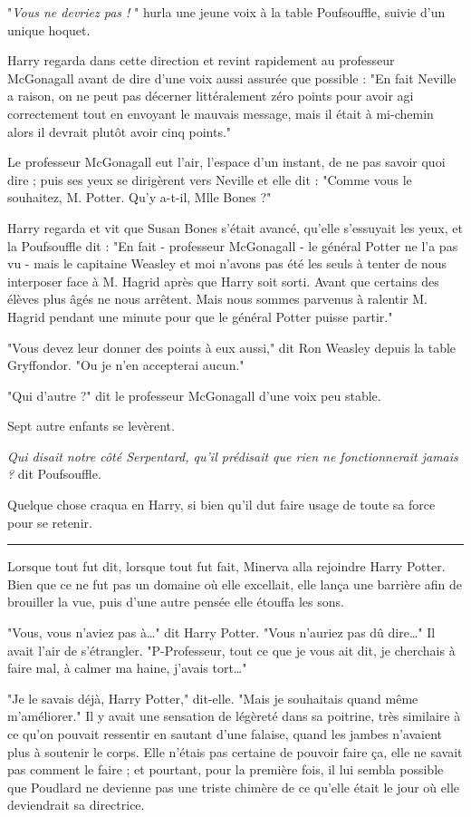 "\emph{Vous ne devriez pas !} " hurla une jeune voix à la table Poufsouffle, suivie d'un unique hoquet.

Harry regarda dans cette direction et revint rapidement au professeur McGonagall avant de dire d'une voix aussi assurée que possible : "En fait Neville a raison, on ne peut pas décerner littéralement zéro points pour avoir agi correctement tout en envoyant le mauvais message, mais il était à mi-chemin alors il devrait plutôt avoir cinq points."

Le professeur McGonagall eut l'air, l'espace d'un instant, de ne pas savoir quoi dire ; puis ses yeux se dirigèrent vers Neville et elle dit : "Comme vous le souhaitez, M. Potter. Qu'y a-t-il, Mlle Bones ?"

Harry regarda et vit que Susan Bones s'était avancé, qu'elle s'essuyait les yeux, et la Poufsouffle dit : "En fait - professeur McGonagall - le général Potter ne l'a pas vu - mais le capitaine Weasley et moi n'avons pas été les seuls à tenter de nous interposer face à M. Hagrid après que Harry soit sorti. Avant que certains des élèves plus âgés ne nous arrêtent. Mais nous sommes parvenus à ralentir M. Hagrid pendant une minute pour que le général Potter puisse partir."

"Vous devez leur donner des points à eux aussi," dit Ron Weasley depuis la table Gryffondor. "Ou je n'en accepterai aucun."

"Qui d'autre ?" dit le professeur McGonagall d'une voix peu stable.

Sept autre enfants se levèrent.

\emph{Qui disait notre côté Serpentard, qu'il prédisait que rien ne fonctionnerait jamais ?}  dit Poufsouffle.

Quelque chose craqua en Harry, si bien qu'il dut faire usage de toute sa force pour se retenir.
\par\noindent\rule{\textwidth}{0.4pt}
Lorsque tout fut dit, lorsque tout fut fait, Minerva alla rejoindre Harry Potter. Bien que ce ne fut pas un domaine où elle excellait, elle lança une barrière afin de brouiller la vue, puis d'une autre pensée elle étouffa les sons.

"Vous, vous n'aviez pas à…" dit Harry Potter. "Vous n'auriez pas dû dire…" Il avait l'air de s'étrangler. "P-Professeur, tout ce que je vous ait dit, je cherchais à faire mal, à calmer ma haine, j'avais tort…"

"Je le savais déjà, Harry Potter," dit-elle. "Mais je souhaitais quand même m'améliorer." Il y avait une sensation de légèreté dans sa poitrine, très similaire à ce qu'on pouvait ressentir en sautant d'une falaise, quand les jambes n'avaient plus à soutenir le corps. Elle n'étais pas certaine de pouvoir faire ça, elle ne savait pas comment le faire ; et pourtant, pour la première fois, il lui sembla possible que Poudlard ne devienne pas une triste chimère de ce qu'elle était le jour où elle deviendrait sa directrice.

